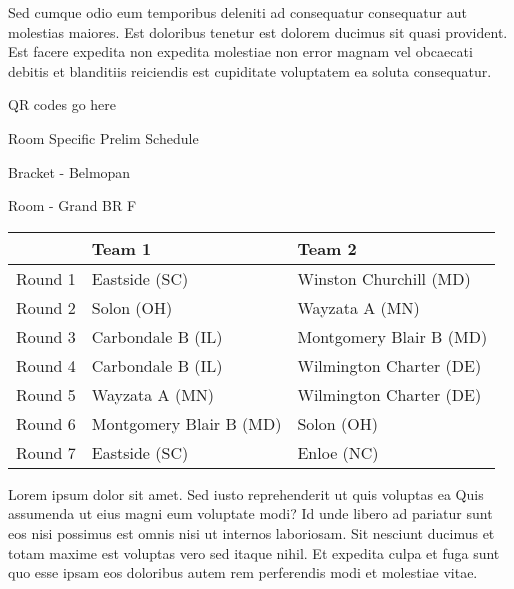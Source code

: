 \documentclass{article}%
\begin{document}
\newline%
Sed cumque odio eum temporibus deleniti ad consequatur consequatur aut molestias maiores. Est doloribus tenetur est dolorem ducimus sit quasi provident. Est facere expedita non expedita molestiae non error magnam vel obcaecati debitis et blanditiis reiciendis est cupiditate voluptatem ea soluta consequatur.%
\vspace*{140pt}%
\begin{center}%
\begin{Huge}%
QR codes go here%
\end{Huge}%
\end{center}%
\newpage%
\begin{center}%
\begin{Huge}%
Room Specific Prelim Schedule%
\end{Huge}%
\vspace*{8pt}%
\linebreak%
\begin{Large}%
Bracket {-} Belmopan%
\end{Large}%
\vspace*{8pt}%
\linebreak%
\vspace*{8pt}%
\begin{Large}%
Room {-} Grand BR F%
\end{Large}%
\end{center}%
%
\begin{tabularx}{\textwidth}{|c|Y|Y|}%
\hline%
&Team 1&Team 2\\%
\hline%
Round 1&Eastside (SC)&Winston Churchill (MD)\\%
Round 2&Solon (OH)&Wayzata A (MN)\\%
Round 3&Carbondale B (IL)&Montgomery Blair B (MD)\\%
Round 4&Carbondale B (IL)&Wilmington Charter (DE)\\%
Round 5&Wayzata A (MN)&Wilmington Charter (DE)\\%
Round 6&Montgomery Blair B (MD)&Solon (OH)\\%
Round 7&Eastside (SC)&Enloe (NC)\\%
\hline%
\end{tabularx}%
\vspace*{8pt}%
\newline%
Lorem ipsum dolor sit amet. Sed iusto reprehenderit ut quis voluptas ea Quis assumenda ut eius magni eum voluptate modi? Id unde libero ad pariatur sunt eos nisi possimus est omnis nisi ut internos laboriosam. Sit nesciunt ducimus et totam maxime est voluptas vero sed itaque nihil. Et expedita culpa et fuga sunt quo esse ipsam eos doloribus autem rem perferendis modi et molestiae vitae.\newline%
\end{document}
